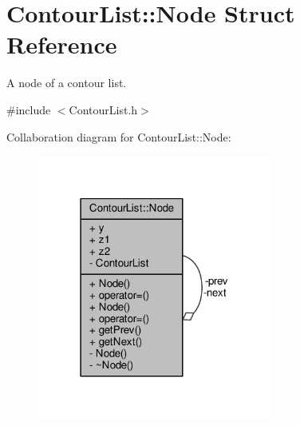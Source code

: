 \hypertarget{structContourList_1_1Node}{}\section{Contour\+List\+:\+:Node Struct Reference}
\label{structContourList_1_1Node}


A node of a contour list.  




{\ttfamily \#include $<$Contour\+List.\+h$>$}



Collaboration diagram for Contour\+List\+:\+:Node\+:
\nopagebreak
\begin{figure}[H]
\begin{center}
\leavevmode
\includegraphics[width=219pt]{structContourList_1_1Node__coll__graph}
\end{center}
\end{figure}

